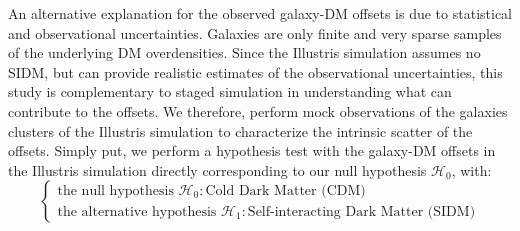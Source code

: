 An alternative explanation for the observed galaxy-DM offsets is due to 
statistical and observational uncertainties. Galaxies are only finite and very
sparse samples of the underlying DM overdensities.
Since the Illustris simulation assumes no SIDM, but can provide realistic
estimates of the observational uncertainties, this study is complementary to 
staged simulation in understanding what can contribute to the offsets.
We therefore, perform mock observations of the galaxies clusters of the
Illustris simulation to characterize the intrinsic scatter of the offsets.  
Simply put, we perform a hypothesis test with the galaxy-DM offsets in
the Illustris simulation directly corresponding to our null hypothesis
$\mathcal{H}_0$, with: 
\begin{equation}
\begin{cases}
	\text{the null hypothesis }\mathcal{H}_0: \text{Cold Dark Matter (CDM)} \\
	\text{the alternative hypothesis }\mathcal{H}_1: \text{Self-interacting Dark
	Matter (SIDM)} 
\end{cases}
\end{equation}


